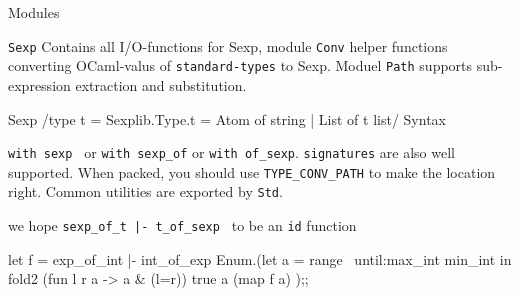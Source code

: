 Modules

\verb|Sexp| Contains all I/O-functions for Sexp, module \verb|Conv|
helper functions converting OCaml-valus of \verb|standard-types| to
Sexp. Moduel \verb|Path| supports sub-expression extraction and
substitution.

Sexp 
/type t = Sexplib.Type.t = Atom of string | List of t list/
Syntax

\verb|with sexp | or \verb|with sexp_of| or \verb|with of_sexp|. 
\verb|signatures| are also  well supported. When packed, you should
use \verb|TYPE_CONV_PATH| to make the location right. Common utilities
are exported by \verb|Std|.

we hope \verb/sexp_of_t |- t_of_sexp / to be an \verb|id| function
\begin{ocamlcode}
let f = exp_of_int |- int_of_exp 
Enum.(let a = range ~until:max_int min_int in 
        fold2 (fun l r a -> a & (l=r)) true a (map f a) );;  
\end{ocamlcode}

